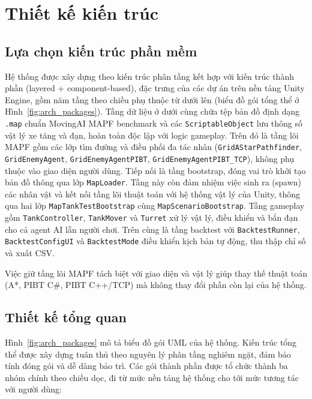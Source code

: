 \documentclass[../DoAn.tex]{subfiles}
\begin{document}

\section{Thiết kế kiến trúc}

\subsection{Lựa chọn kiến trúc phần mềm}

Hệ thống được xây dựng theo kiến trúc phân tầng kết hợp với kiến trúc thành phần
(layered + component-based), đặc trưng của các dự án trên nền tảng Unity Engine, gồm
năm tầng theo chiều phụ thuộc từ dưới lên (biểu đồ gói tổng thể ở
Hình~\ref{fig:arch_packages}). Tầng dữ liệu ở dưới cùng chứa tệp bản đồ định
dạng \texttt{.map} chuẩn MovingAI MAPF benchmark và các \texttt{ScriptableObject} lưu
thông số vật lý xe tăng và đạn, hoàn toàn độc lập với logic gameplay. Trên đó là tầng lõi
MAPF gồm các lớp tìm đường và điều phối đa tác nhân (\texttt{GridAStarPathfinder},
\texttt{GridEnemyAgent}, \texttt{GridEnemyAgentPIBT}, \texttt{GridEnemyAgentPIBT\_TCP}),
không phụ thuộc vào giao diện người dùng. Tiếp nối là tầng bootstrap, đóng vai trò
khởi tạo bản đồ thông qua lớp \texttt{MapLoader}. Tầng này còn đảm nhiệm việc sinh ra
(spawn) các nhân vật và kết nối tầng lõi thuật toán với hệ thống vật lý của Unity,
thông qua hai lớp \texttt{MapTankTestBootstrap} cùng \texttt{MapScenarioBootstrap}. Tầng gameplay gồm
\texttt{TankController}, \texttt{TankMover} và \texttt{Turret} xử lý vật lý, điều khiển
và bắn đạn cho cả agent AI lẫn người chơi. Trên cùng là tầng backtest với
\texttt{BacktestRunner}, \texttt{BacktestConfigUI} và \texttt{BacktestMode} điều khiển
kịch bản tự động, thu thập chỉ số và xuất CSV.

Việc giữ tầng lõi MAPF tách biệt với giao diện và vật lý giúp thay thế thuật toán
(A*, PIBT C\#, PIBT C++/TCP) mà không thay đổi phần còn lại của hệ thống.

\subsection{Thiết kế tổng quan}

Hình~\ref{fig:arch_packages} mô tả biểu đồ gói UML của hệ thống. Kiến trúc tổng thể được xây dựng tuân thủ theo nguyên lý phân tầng nghiêm ngặt, đảm bảo tính đóng gói và dễ dàng bảo trì. Các gói thành phần được tổ chức thành ba nhóm chính theo chiều dọc, đi từ mức nền tảng hệ thống cho tới mức tương tác với người dùng:
\end{document}
